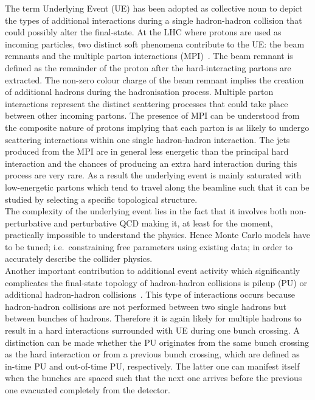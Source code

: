 The term Underlying Event (UE) has been adopted as collective noun to depict the types of additional interactions during a single hadron-hadron collision that could possibly alter the final-state. At the LHC where protons are used as incoming particles, two distinct soft phenomena contribute to the UE: the beam remnants and the multiple parton interactions (MPI)~\cite{}.
The beam remnant is defined as the remainder of the proton after the hard-interacting partons are extracted. The non-zero colour charge of the beam remnant implies the creation of additional hadrons during the hadronisation process.
Multiple parton interactions represent the distinct scattering processes that could take place between other incoming partons. 
The presence of MPI can be understood from the composite nature of protons implying that each parton is as likely to undergo scattering interactions within one single hadron-hadron interaction.
The jets produced from the MPI  are in general less energetic than the principal hard interaction and the chances of producing an extra hard interaction during this process are very rare.
As a result the underlying event is mainly saturated with low-energetic partons which tend to travel along the beamline such that it can be studied by selecting a specific topological structure.
\\
The complexity of the underlying event lies in the fact that it involves both non-perturbative and perturbative QCD making it, at least for the moment, practically impossible to understand the physics. Hence Monte Carlo models have to be tuned; i.e.\ constraining free parameters using existing data; in order to accurately describe the collider physics.
\\

Another important contribution to additional event activity which significantly complicates the final-state topology of hadron-hadron collisions is pileup (PU) or additional hadron-hadron collisions~\cite{}. This type of interactions occurs because hadron-hadron collisions are not performed between two single hadrons but between bunches of hadrons. Therefore it is again likely for multiple hadrons to result in a hard interactions surrounded with UE during one bunch crossing. A distinction can be made whether the PU originates from the same bunch crossing as the hard interaction or from a previous bunch crossing, which are defined as in-time PU and out-of-time PU, respectively. The latter one can manifest itself when the bunches are spaced such that the next one arrives before the previous one evacuated completely from the detector.

